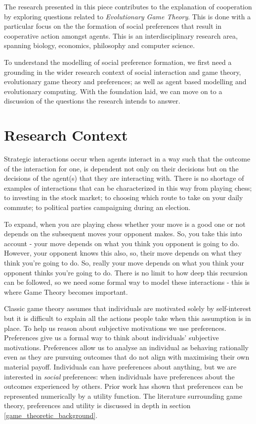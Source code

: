 \documentclass[11pt]{book}
\newcommand*{\np}{\par\noindent\newline}
\begin{document}
\np The research presented in this piece contributes to the explanation of cooperation by exploring questions related to \textit{Evolutionary Game Theory}.
This is done with a particular focus on the the formation of social preferences that result in cooperative action amongst agents.
This is an interdisciplinary research area, spanning biology, economics, philosophy and computer science.

\np To understand the modelling of social preference formation, we first need a grounding in the wider research context of social interaction and game theory, evolutionary game theory and preferences; as well as agent based modelling and evolutionary computing. 
With the foundation laid, we can move on to a discussion of the questions the research intends to answer.

\section{Research Context}
Strategic interactions occur when agents interact in a way such that the outcome of the interaction for one, is dependent not only on their decisions but on the decisions of the agent(s) that they are interacting with.
There is no shortage of examples of interactions that can be characterized in this way from playing chess;
to investing in the stock market; to choosing which route to take on your daily commute; to political parties campaigning during an election.

\np To expand, when you are playing chess whether your move is a good one or not depends on the subsequent moves your opponent makes. 
So, you take this into account - your move depends on what you think you opponent is going to do.
However, your opponent knows this also, so, their move depends on what they think you're going to do.
So, really your move depends on what you think your opponent thinks you're going to do.
There is no limit to how deep this recursion can be followed, so we need some formal way to model these interactions - this is where Game Theory becomes important.

\np Classic game theory assumes that individuals are motivated solely by self-interest but it is difficult to explain all the actions people take when this assumption is in place.
To help us reason about subjective motivations we use preferences.
Preferences give us a formal way to think about individuals' subjective motivations.
Preferences allow us to analyse an individual as behaving rationally even as they are pursuing outcomes that do not align with maximising their own material payoff.
Individuals can have preferences about anything, but we are interested in \textit{social} preferences: when individuals have preferences about the outcomes experienced by others.
Prior work has shown that preferences can be represented numerically by a utility function.
The literature surrounding game theory, preferences and utility is discussed in depth in section \ref{game_theoretic_background}.
\end{document}
